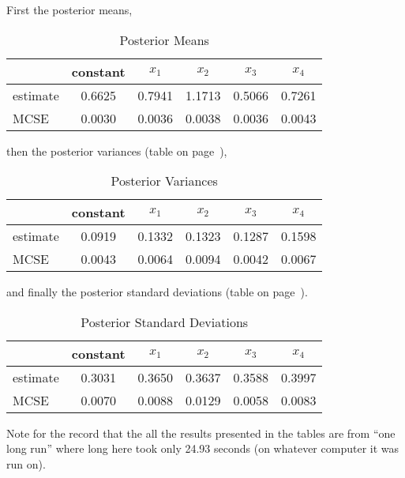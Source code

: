 \documentclass{article}
\begin{document}
First the posterior means,
\begin{table}[ht]
\caption{Posterior Means}
\label{tab:mu}
\begin{center}
\begin{tabular}{lccccc}
\hline
 & constant & $x_1$ & $x_2$ & $x_3$ & $x_4$ \\
\hline
estimate & 0.6625 & 0.7941 & 1.1713 & 0.5066 & 0.7261 \\
MCSE & 0.0030 & 0.0036 & 0.0038 & 0.0036 & 0.0043 \\
\hline
\end{tabular}\end{center}
\end{table}
then the posterior variances (table on page~\pageref{tab:sigmasq}),
\begin{table}[ht]
\caption{Posterior Variances}
\label{tab:sigmasq}
\begin{center}
\begin{tabular}{lccccc}
\hline
 & constant & $x_1$ & $x_2$ & $x_3$ & $x_4$ \\
\hline
estimate & 0.0919 & 0.1332 & 0.1323 & 0.1287 & 0.1598 \\
MCSE & 0.0043 & 0.0064 & 0.0094 & 0.0042 & 0.0067 \\
\hline
\end{tabular}\end{center}
\end{table}
and finally the posterior standard deviations
(table on page~\pageref{tab:sigma}).
\begin{table}[ht]
\caption{Posterior Standard Deviations}
\label{tab:sigma}
\begin{center}
\begin{tabular}{lccccc}
\hline
 & constant & $x_1$ & $x_2$ & $x_3$ & $x_4$ \\
\hline
estimate & 0.3031 & 0.3650 & 0.3637 & 0.3588 & 0.3997 \\
MCSE & 0.0070 & 0.0088 & 0.0129 & 0.0058 & 0.0083 \\
\hline
\end{tabular}\end{center}
\end{table}

Note for the record that the all the results presented in the tables
are from ``one long run'' where long here took only
24.93 seconds (on whatever computer it was run on).
\end{document}
